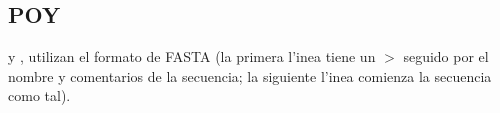 \subsection{POY}
\noindent
{} y , utilizan el formato de FASTA (la primera l'inea tiene un 
\begin{math}
>
\end{math}
seguido por el nombre y comentarios de la secuencia; la siguiente l'inea comienza la secuencia como tal).\\
\\
\noindent
{}
